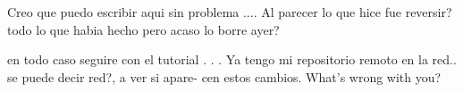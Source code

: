 Creo que puedo escribir aqui sin problema
....
Al parecer lo que hice fue reversir? todo lo que habia hecho
pero acaso lo borre ayer?

en todo caso seguire con el tutorial
.
.
.
Ya tengo mi repositorio remoto en la red.. se puede decir red?, a ver si apare-
cen estos cambios.
What's wrong with you?
